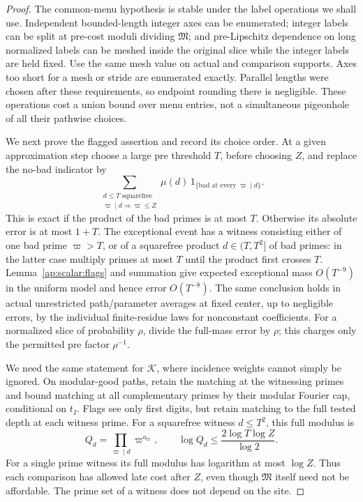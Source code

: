 \begin{proof}
The common-menu hypothesis is stable under the label operations we
shall use. Independent bounded-length integer axes can be enumerated;
integer labels can be split at pre-cost moduli dividing $\mathfrak M$;
and pre-Lipschitz dependence on long normalized labels can be meshed
inside the original slice while the integer labels are held fixed.
Use the same mesh value on actual and comparison supports. Axes too
short for a mesh or stride are enumerated exactly. Parallel lengths
were chosen after these requirements, so endpoint rounding there is
negligible. These operations cost a union bound over menu entries,
not a simultaneous pigeonhole of all their pathwise choices.

We next prove the flagged assertion and record its choice order.
At a given approximation step choose a large pre threshold $T$, before
choosing $Z$, and replace the no-bad indicator by
\begin{equation}\label{ap:scalar:truncated-flags}
 \sum_{\substack{d\le T\text{ squarefree}\\
                 \varpi\mid d\Rightarrow\varpi\le Z}}
       \mu(d)\,1_{\{\text{bad at every }\varpi\mid d\}}.
\end{equation}
This is exact if the product of the bad primes is at most $T$.
Otherwise its absolute error is at most $1+T$. The exceptional event
has a witness consisting either of one bad prime $\varpi>T$, or of a
squarefree product $d\in(T,T^2]$ of bad primes: in the latter case
multiply primes at most $T$ until the product first crosses $T$.
Lemma~\ref{ap:scalar:flags} and summation give expected exceptional
mass $O(T^{-9})$ in the uniform model and hence error $O(T^{-8})$.
The same conclusion holds in actual unrestricted path/parameter
averages at fixed center, up to negligible errors, by the individual
finite-residue laws for nonconstant coefficients. For a normalized
slice of probability $\rho$, divide the full-mass error by $\rho$;
this charges only the permitted pre factor $\rho^{-1}$.

We need the same statement for $\mathcal K$, where incidence weights
cannot simply be ignored. On modular-good paths, retain the matching
at the witnessing primes and bound matching at all complementary
primes by their modular Fourier cap, conditional on $t_I$. Flags see
only first digits, but retain matching to the full tested depth at
each witness prime. For a squarefree witness $d\le T^2$, this full
modulus is
\begin{equation}\label{ap:scalar:witness-modulus}
 Q_d=\prod_{\varpi\mid d}\varpi^{a_\varpi},\qquad
 \log Q_d\le\frac{2\log T\log Z}{\log2}.
\end{equation}
For a single prime witness its full modulus has logarithm at most
$\log Z$. Thus each comparison has allowed late cost after $Z$,
even though $\mathfrak M$ itself need not be affordable. The prime
set of a witness does not depend on the site.


\end{proof}
